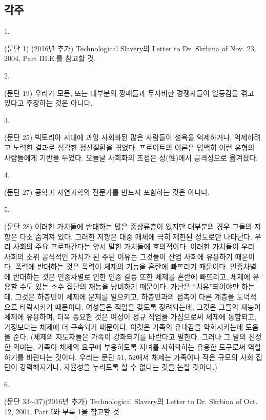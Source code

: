 \documentclass[11pt,a4paper]{article}
\begin{document}
\begin{multicols}{2}
\section*{각주} 


   
 \hypertarget{1}{1.} (문단 1) (2016년 추가) \textlangle{}Technological Slavery\textrangle{}의 \textlangle{}Letter to Dr. Skrbina of Nov. 23, 2004,  Part III.E.\textrangle{}를 참고할 것. 
 
 
\hypertarget{2}{2.} (문단 19) 우리가 모든, 또는 대부분의 깡패들과 무자비한 경쟁자들이 열등감을 겪고 있다고 주장하는  것은 아니다. 


 \hypertarget{3}{3.} (문단 25) 빅토리아 시대에 과잉 사회화된 많은 사람들이 성욕을 억제하거나, 억제하려고 노력한  결과로 심각한 정신질환을 겪었다. 프로이트의 이론은 명백히 이런 유형의 사람들에게 기반을 두었다.  오늘날 사회화의 초점은 성(性)에서 공격성으로 옮겨졌다.  
 

\hypertarget{4}{4.} (문단 27) 공학과 자연과학의 전문가를 반드시 포함하는 것은 아니다. 


\hypertarget{5}{5.} (문단 28) 이러한 가치들에 반대하는 많은 중상류층이 있지만 대부분의 경우 그들의 저항은 다소 숨겨져 있다. 그러한 저항은 대중 매체에 극히 제한된 정도로만 나타난다. 우리 사회의 주요 프로파간다는 앞서 말한 가치들에 호의적이다. 이러한 가치들이 우리 사회의 소위 공식적인 가치가 된 주된 이유는  그것들이 산업 사회에 유용하기 때문이다. 폭력에 반대하는 것은 폭력이 체제의 기능을 혼란에 빠뜨리기  때문이다. 인종차별에 반대하는 것은 인종차별로 인한 인종 갈등 또한 체제를 혼란에 빠뜨리고, 체제에  유용할 수도 있는 소수 집단의 재능을 낭비하기 때문이다. 가난은 “치유”되어야만 하는데, 그것은  하층민이 체제에 문제를 일으키고, 하층민과의 접촉이 다른 계층을 도덕적으로 타락시키기 때문이다.  여성들은 직업을 갖도록 장려되는데, 그것은 그들의 재능이 체제에 유용하며, 더욱 중요한 것은 여성이  정규 직업을 가짐으로써 체제에 통합되고, 가정보다는 체제에 더 구속되기 때문이다. 이것은 가족의  유대감을 약화시키는데 도움을 준다. (체제의 지도자들은 가족이 강화되기를 바란다고 말한다. 그러나 그 말의 진정한 의미는, 가족이 체제의 요구에 부응하도록 자녀를 사회화하는 유용한 도구로써 역할하기를  바란다는 것이다. 우리는 문단 51, 52에서 체제는 가족이나 작은 규모의 사회 집단이 강력해지거나,  자율성을 누리도록 할 수 없다는 것을 논할 것이다.) 


\hypertarget{6}{6.} (문단 33${\sim}$37)(2016년 추가) \textlangle{}Technological Slavery\textrangle{}의 \textlangle{}Letter to Dr. Skrbina of Oct. 12,  2004, Part I\textrangle{}와 부록 1을 참고할 것. 



\end{multicols}
\end{document}
